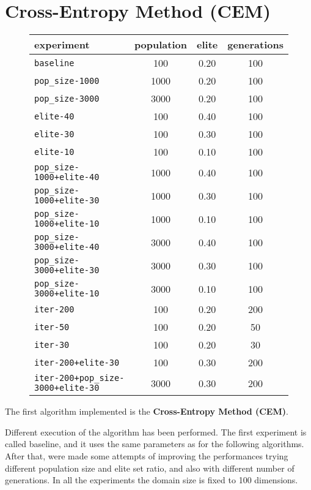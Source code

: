 \section{Cross-Entropy Method (CEM)}
\begin{figure}[H]
	\centering
	
	\begin{tabular}{lccc}
		\toprule
		\textbf{experiment} & \textbf{population} & \textbf{elite} &
		\textbf{generations} \\
		\midrule
		\texttt{baseline 						}	 & 100 	& 0.20 	& 100\\
		\texttt{pop\_size-1000 					}	 & 1000 	& 0.20 	& 100\\
		\texttt{pop\_size-3000 					}	 & 3000 	& 0.20 	& 100\\
		\texttt{elite-40 						}	 & 100 	& 0.40 	& 100\\
		\texttt{elite-30 						}	 & 100 	& 0.30 	& 100\\
		\texttt{elite-10 						}	 & 100 	& 0.10 	& 100\\
		\texttt{pop\_size-1000+elite-40 		}	 & 1000 	& 0.40 	& 100\\
		\texttt{pop\_size-1000+elite-30 		}	 & 1000 	& 0.30 	& 100\\
		\texttt{pop\_size-1000+elite-10 		}	 & 1000 	& 0.10 	& 100\\
		\texttt{pop\_size-3000+elite-40 		}	 & 3000 	& 0.40 	& 100\\
		\texttt{pop\_size-3000+elite-30 		}	 & 3000 	& 0.30 	& 100\\
		\texttt{pop\_size-3000+elite-10 		}	 & 3000 	& 0.10 	& 100\\
		\texttt{iter-200 						}	 & 100 	& 0.20 	& 200\\
		\texttt{iter-50 						}	 & 100 	& 0.20 	& 50\\
		\texttt{iter-30 						}	 & 100 	& 0.20 	& 30\\
		\texttt{iter-200+elite-30 				}	 & 100 	& 0.30 	& 200\\
		\texttt{iter-200+pop\_size-3000+elite-30} 	 & 3000 	& 0.30 	& 200\\	
		\bottomrule
	\end{tabular}
	\label{tab:cem-param}
\end{figure}

The first algorithm implemented is the \textbf{Cross-Entropy Method (CEM)}. 

Different execution of the algorithm has been performed. The first experiment is called baseline, and it uses the same parameters as for the following algorithms. After that, were made some attempts of improving the performances trying different population size and elite set ratio, and also with different number of generations. In all the experiments the domain size is fixed to 100 dimensions.

